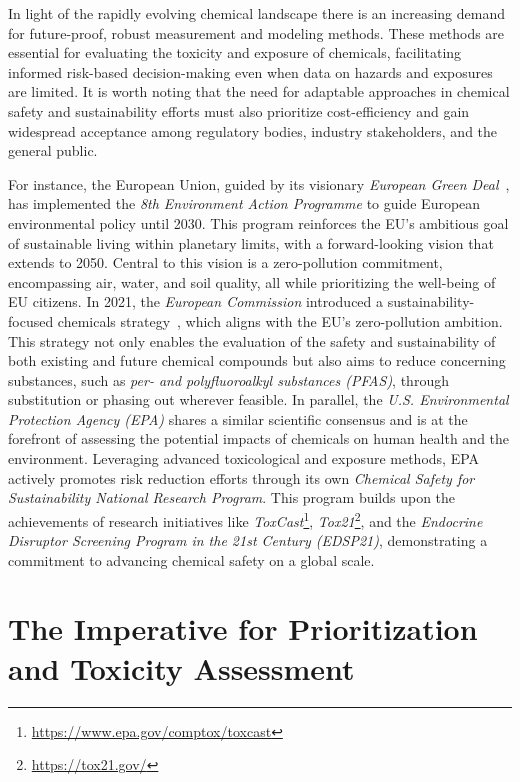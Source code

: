 In light of the rapidly evolving chemical landscape there is an increasing demand for future-proof, robust measurement and modeling methods. These methods are essential for evaluating the toxicity and exposure of chemicals, facilitating  informed risk-based decision-making even when data on hazards and exposures are limited. It is worth noting that the need for adaptable approaches in chemical safety and sustainability efforts must also prioritize cost-efficiency and gain widespread acceptance among regulatory bodies, industry stakeholders, and the general public.

For instance, the European Union, guided by its visionary \emph{European Green Deal}~\cite{greendeal}, has implemented the \emph{8th Environment Action Programme} to guide European environmental policy until 2030. This program reinforces the EU's ambitious goal of sustainable living within planetary limits, with a forward-looking vision that extends to 2050. Central to this vision is a zero-pollution commitment, encompassing air, water, and soil quality, all while prioritizing the well-being of EU citizens. In 2021, the \emph{European Commission} introduced a sustainability-focused chemicals strategy~\cite{EUChemicalsStrategy}, which aligns with the EU's zero-pollution ambition. This strategy not only enables the evaluation of the safety and sustainability of both existing and future chemical compounds but also aims to reduce concerning substances, such as \emph{per- and polyfluoroalkyl substances (PFAS)}, through substitution or phasing out wherever feasible. In parallel, the \emph{U.S. Environmental Protection Agency (EPA)} shares a similar scientific consensus and is at the forefront of assessing the potential impacts of chemicals on human health and the environment. Leveraging advanced toxicological and exposure methods, EPA actively promotes risk reduction efforts through its own \emph{Chemical Safety for Sustainability National Research Program}. This program builds upon the achievements of research initiatives like \emph{ToxCast}\footnote{\url{https://www.epa.gov/comptox/toxcast}}, \emph{Tox21}\footnote{\url{https://tox21.gov/}}, and the \emph{Endocrine Disruptor Screening Program in the 21st Century (EDSP21)}, demonstrating a commitment to advancing chemical safety on a global scale.


\section{The Imperative for Prioritization and Toxicity Assessment}

